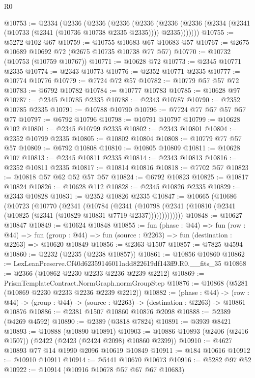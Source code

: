 \begin{lexlean}{R0}
\begin{coremodule}
@10753 := @2334
    (@2336
      (@2336
        (@2336
          (@2336
            (@2336 (@2336 (@2334 (@2341 (@10733 (@2341 (@10736 @10738 @2335 @2335)))) @2335)))))))
@10755 := @5272 @102 @67
@10759 := @10755 @10683 @67 @10683 @57
@10767 := @2675 @10689 @10692 @72 (@2675 @10735 @10738 @77 @57)
@10770 := @10732 (@10753 (@10759 @10767))
@10771 := @10628 @72
@10773 := @2345 @10771 @2335
@10774 := @2343 @10773
@10776 := @2352 @10771 @2335
@10777 := @10774 @10776
@10779 := @7724 @72 @57
@10782 := @10779 @57 @57 @72
@10783 := @6792 @10782
@10784 := @10777 @10783
@10785 := @10628 @97
@10787 := @2345 @10785 @2335
@10788 := @2343 @10787
@10790 := @2352 @10785 @2335
@10791 := @10788 @10790
@10796 := @7724 @77 @57 @57 @57 @77
@10797 := @6792 @10796
@10798 := @10791 @10797
@10799 := @10628 @102
@10801 := @2345 @10799 @2335
@10802 := @2343 @10801
@10804 := @2352 @10799 @2335
@10805 := @10802 @10804
@10808 := @10779 @77 @57 @57
@10809 := @6792 @10808
@10810 := @10805 @10809
@10811 := @10628 @107
@10813 := @2345 @10811 @2335
@10814 := @2343 @10813
@10816 := @2352 @10811 @2335
@10817 := @10814 @10816
@10818 := @7702 @57
@10823 := @10818 @57 @62 @52 @57 @57
@10824 := @6792 @10823
@10825 := @10817 @10824
@10826 := @10628 @112
@10828 := @2345 @10826 @2335
@10829 := @2343 @10828
@10831 := @2352 @10826 @2335
@10847 := @10665
    (@10686
      (@10723
        (@10770
          (@2341
            (@10784
              (@2341
                (@10798 (@2341 (@10810 (@2341 (@10825 (@2341 (@10829 @10831 @7719 @2337)))))))))))))
@10848 := @10627 @10847
@10849 := @10624 @10848
@10855 := fun (phase : @44) =>
  fun (row : @44) =>
  fun (group : @44) => fun (source : @2263) => fun (destination : @2263) => @10620 @10849
@10856 := @2363 @1507
@10857 := @7825 @4594
@10860 := @2232 (@2235 (@2238 @10857))
@10861 := @10856 @10860
@10862 := LexLeanPreserve.Cf40d62359146011add822619df143ff9.R0.__fits_35
@10868 := @2366 (@10862 @2230 @2233 @2236 @2239 @2212)
@10869 := PrismTemplateContract.NormGraph.normGroupStep
@10876 := @10868 (@5281 (@10869 @2230 @2233 @2236 @2239 @2212))
@10882 := (phase : @44) ->
  (row : @44) -> (group : @44) -> (source : @2263) -> (destination : @2263) -> @10861 @10876
@10886 := @2381 @1507 @10860 @10876 @2098
@10888 := @2389 (@4269 @4592)
@10890 := @2389 (@3818 @7824)
@10891 := @3939 @8421
@10893 := @10888 (@10890 @10891)
@10903 := @10886 @10893 (@2406 (@2416 @1507)) (@2422 (@2423 (@2424 @2098) @10860 @2399))
@10910 := @4627 @10893 @77 @14 @1990 @2096 @10619 @10849
@10911 := @184 @10616
@10912 := @10910 @10911
@10914 := @5441 @10670 @10673
@10916 := @5282 @97 @52
@10922 := @10914 (@10916 @10678 @57 @67 @67 @10683)

\end{coremodule}
\end{lexlean}
